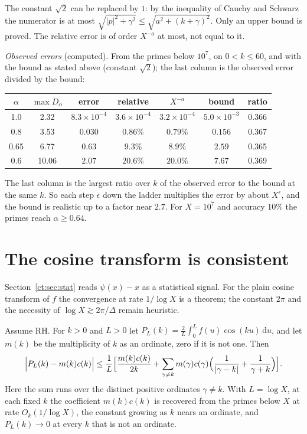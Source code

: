 The constant $\sqrt2$ can be replaced by $1$: by the inequality of Cauchy and Schwarz the numerator is at most $\sqrt{|p|^2+\gamma^2}\le\sqrt{a^2+(k+\gamma)^2}$. Only an upper bound is proved. The relative error is of order $X^{-a}$ at most, not equal to it.

\emph{Observed errors} (computed). From the primes below $10^7$, on $0<k\le60$, and with the bound as stated above (constant $\sqrt2$); the last column is the observed error divided by the bound:
\begin{center}
\small
\begin{tabular}{ccccccc}
\toprule
$\alpha$ & $\max D_\alpha$ & error & relative & $X^{-a}$ & bound & ratio\\
\midrule
1.0 & 2.32 & $8.3\times10^{-4}$ & $3.6\times10^{-4}$ & $3.2\times10^{-4}$ & $5.0\times10^{-3}$ & 0.366\\
0.8 & 3.53 & $0.030$ & $0.86\%$ & $0.79\%$ & $0.156$ & 0.367\\
0.65 & 6.77 & $0.63$ & $9.3\%$ & $8.9\%$ & $2.59$ & 0.365\\
0.6 & 10.06 & $2.07$ & $20.6\%$ & $20.0\%$ & $7.67$ & 0.369\\
\bottomrule
\end{tabular}
\end{center}
The last column is the largest ratio over $k$ of the observed error to the bound at the same $k$. So each step $\epsilon$ down the ladder multiplies the error by about $X^{\epsilon}$, and the bound is realistic up to a factor near $2.7$. For $X=10^7$ and accuracy $10\%$ the primes reach $\alpha\ge0.64$.

\section{The cosine transform is consistent}

Section~\ref{ct:sec:stat} reads $\psi(x)-x$ as a statistical signal. For the plain cosine transform of $f$ the convergence at rate $1/\log X$ is a theorem; the constant $2\pi$ and the necessity of $\log X\gtrsim2\pi/\Delta$ remain heuristic.

\begin{theorem}\label{xf:thm:consist}
Assume RH. For $k>0$ and $L>0$ let $P_L(k)=\frac2L\int_0^Lf(u)\cos(ku)\,\mathrm du$, and let $m(k)$ be the multiplicity of $k$ as an ordinate, zero if it is not one. Then
\[
\Bigl|P_L(k)-m(k)c(k)\Bigr|\le\frac1L\Bigl[\frac{m(k)c(k)}{2k}+\sum_{\gamma\ne k}m(\gamma)c(\gamma)\Bigl(\frac1{|\gamma-k|}+\frac1{\gamma+k}\Bigr)\Bigr].
\]
Here the sum runs over the distinct positive ordinates $\gamma\ne k$. With $L=\log X$, at each fixed $k$ the coefficient $m(k)c(k)$ is recovered from the primes below $X$ at rate $O_k(1/\log X)$, the constant growing as $k$ nears an ordinate, and $P_L(k)\to0$ at every $k$ that is not an ordinate.
\end{theorem}

